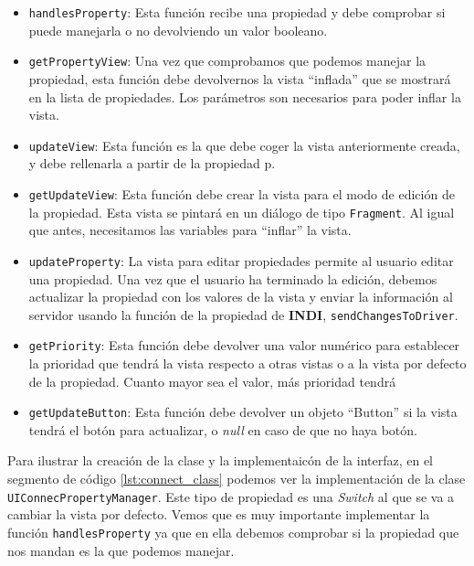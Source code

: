 \begin{itemize}
  \item \texttt{handlesProperty}:
  Esta función recibe una propiedad y debe comprobar si puede manejarla o no devolviendo un valor booleano.

  \item \texttt{getPropertyView}:
  Una vez que comprobamos que podemos manejar la propiedad, esta función debe devolvernos la vista ``inflada'' que se mostrará en la lista de propiedades. Los parámetros  son necesarios para poder inflar la vista.

  \item \texttt{updateView}:
  Esta función es la que debe coger la vista anteriormente creada, y debe rellenarla a partir de la propiedad p.

  \item \texttt{getUpdateView}:
  Esta función debe crear la vista para el modo de edición de la propiedad. Esta vista se pintará en un diálogo de tipo \texttt{Fragment}. Al igual que antes, necesitamos las variables  para ``inflar'' la vista.

  \item \texttt{updateProperty}:
  La vista para editar propiedades permite al usuario editar una propiedad. Una vez que el usuario ha terminado la edición, debemos actualizar la propiedad con los valores de la vista y enviar la información al servidor usando la función de la propiedad de \textbf{INDI}, \texttt{sendChangesToDriver}. 

  \item \texttt{getPriority}:
  Esta función debe devolver una valor numérico para establecer la prioridad que tendrá la vista respecto a otras vistas o a la vista por defecto de la propiedad. Cuanto mayor sea el valor, más prioridad tendrá

  \item \texttt{getUpdateButton}:
  Esta función debe devolver un objeto ``Button'' si la vista tendrá el botón para actualizar, o \textit{null} en caso de que no haya botón.
\end{itemize}

Para ilustrar la creación de la clase y la implementaicón de la interfaz, en el segmento de código \ref{lst:connect_class} podemos ver la implementación de la clase \texttt{UIConnecPropertyManager}. Este tipo de propiedad es una \textit{Switch} al que se va a cambiar la vista por defecto. Vemos que es muy importante implementar la función \texttt{handlesProperty} ya que en ella debemos comprobar si la propiedad que nos mandan es la que podemos manejar. 

